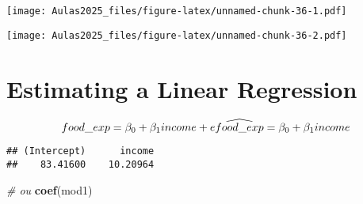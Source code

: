 \documentclass[
]{book}
\newenvironment{Shaded}{\begin{snugshade}}{\end{snugshade}}
\newcommand{\AttributeTok}[1]{\textcolor[rgb]{0.13,0.29,0.53}{#1}}
\newcommand{\CommentTok}[1]{\textcolor[rgb]{0.56,0.35,0.01}{\textit{#1}}}
\newcommand{\DecValTok}[1]{\textcolor[rgb]{0.00,0.00,0.81}{#1}}
\newcommand{\FunctionTok}[1]{\textcolor[rgb]{0.13,0.29,0.53}{\textbf{#1}}}
\newcommand{\NormalTok}[1]{#1}
\newcommand{\OtherTok}[1]{\textcolor[rgb]{0.56,0.35,0.01}{#1}}
\newcommand{\SpecialCharTok}[1]{\textcolor[rgb]{0.81,0.36,0.00}{\textbf{#1}}}
\newcommand{\StringTok}[1]{\textcolor[rgb]{0.31,0.60,0.02}{#1}}
\begin{document}
\texttt{[image: Aulas2025\_files/figure-latex/unnamed-chunk-36-1.pdf]}

\begin{Shaded}
\end{Shaded}

\texttt{[image: Aulas2025\_files/figure-latex/unnamed-chunk-36-2.pdf]}

\hypertarget{estimating-a-linear-regression}{%
\section{Estimating a Linear
Regression}\label{estimating-a-linear-regression}}

\[
food\_exp = \beta_0 + \beta_1 income +e\\[1em]
\widehat{food\_exp} = \beta_0 + \beta_1 income
\]

\begin{Shaded}
\end{Shaded}

\begin{verbatim}
## (Intercept)      income 
##    83.41600    10.20964
\end{verbatim}

\begin{Shaded}
\begin{Highlighting}[]
\CommentTok{\# ou}
\FunctionTok{coef}\NormalTok{(mod1)}
\end{Highlighting}
\end{Shaded}
\end{document}
